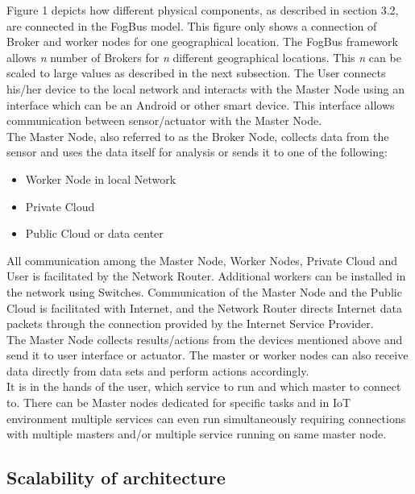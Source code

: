 \documentclass[10pt,journal,compsoc]{IEEEtran}
\begin{document}
Figure 1 depicts how different physical components, as described in section 3.2, are connected in the FogBus model. This figure only shows a connection of Broker and worker nodes for one geographical location. The FogBus framework allows \textit{n} number of Brokers for \textit{n} different geographical locations. This \textit{n} can be scaled to large values as described in the next subsection. The User connects his/her device to the local network and interacts with the Master Node using an interface which can be an Android or other smart device. This interface allows communication between sensor/actuator with the Master Node. \\
The Master Node, also referred to as the Broker Node, collects data from the sensor and uses the data itself for analysis or sends it to one of the following:
\begin{itemize}
\item Worker Node in local Network
\item Private Cloud
\item Public Cloud or data center
\end{itemize}
All communication among the Master Node, Worker Nodes, Private Cloud and User is facilitated by the Network Router. Additional workers can be installed in the network using Switches. Communication of the Master Node and the Public Cloud is facilitated with Internet, and the Network Router directs Internet data packets through the connection provided by the Internet Service Provider.\\
The Master Node collects results/actions from the devices mentioned above and send it to user interface or actuator. The master or worker nodes can also receive data directly from data sets and perform actions accordingly. \\
It is in the hands of the user, which service to run and which master to connect to. There can be Master nodes dedicated for specific tasks and in IoT environment multiple services can even run simultaneously requiring connections with multiple masters and/or multiple service running on same master node. 

\subsection{Scalability of architecture}
\end{document}
